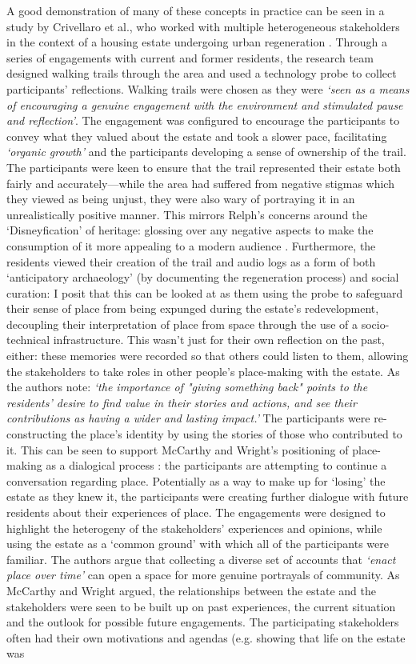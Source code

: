 A good demonstration of many of these concepts in practice can be seen in a study by Crivellaro et al., who worked with multiple heterogeneous stakeholders in the context of a housing estate undergoing urban regeneration \citep{Crivellaro2016}. Through a series of engagements with current and former residents, the research team designed walking trails through the area and used a technology probe to collect participants' reflections. Walking trails were chosen as they were \textit{`seen as a means of encouraging a genuine engagement with the environment and stimulated pause and reflection'}. The engagement was configured to encourage the participants to convey what they valued about the estate and took a slower pace, facilitating \textit{`organic growth'} and the participants developing a sense of ownership of the trail. The participants were keen to ensure that the trail represented their estate both fairly and accurately---while the area had suffered from negative stigmas which they viewed as being unjust, they were also wary of portraying it in an unrealistically positive manner. This mirrors Relph's concerns around the `Disneyfication' of heritage: glossing over any negative aspects to make the consumption of it more appealing to a modern audience \citep{Relph2018}. Furthermore, the residents viewed their creation of the trail and audio logs as a form of both `anticipatory archaeology' (by documenting the regeneration process) and social curation: I posit that this can be looked at as them using the probe to safeguard their sense of place from being expunged during the estate's redevelopment, decoupling their interpretation of place from space through the use of a socio-technical infrastructure. This wasn't just for their own reflection on the past, either: these memories were recorded so that others could listen to them, allowing the stakeholders to take roles in other people's place-making with the estate. As the authors note: \textit{`the importance of "giving something back" points to the residents' desire to find value in their stories and actions, and see their contributions as having a wider and lasting impact.'} The participants were re-constructing the place's identity by using the stories of those who contributed to it. This can be seen to support McCarthy and Wright's positioning of place-making as a dialogical process \citep{McCarthy2005}: the participants are attempting to continue a conversation regarding place. Potentially as a way to make up for `losing' the estate as they knew it, the participants were creating further dialogue with future residents about their experiences of place. The engagements were designed to highlight the heterogeny of the stakeholders' experiences and opinions, while using the estate as a `common ground' with which all of the participants were familiar. The authors argue that collecting a diverse set of accounts that \textit{`enact place over time'} can open a space for more genuine portrayals of community. As McCarthy and Wright argued, the relationships between the estate and the stakeholders were seen to be built up on past experiences, the current situation and the outlook for possible future engagements. The participating stakeholders often had their own motivations and agendas (e.g. showing that life on the estate was 